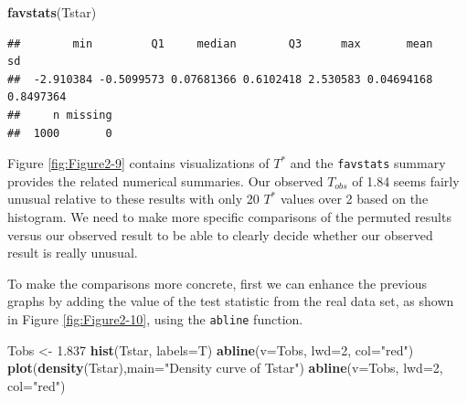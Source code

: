 \documentclass[]{book}
\newenvironment{Shaded}{\begin{snugshade}}{\end{snugshade}}
\newcommand{\KeywordTok}[1]{\textcolor[rgb]{0.13,0.29,0.53}{\textbf{#1}}}
\newcommand{\DataTypeTok}[1]{\textcolor[rgb]{0.13,0.29,0.53}{#1}}
\newcommand{\DecValTok}[1]{\textcolor[rgb]{0.00,0.00,0.81}{#1}}
\newcommand{\FloatTok}[1]{\textcolor[rgb]{0.00,0.00,0.81}{#1}}
\newcommand{\StringTok}[1]{\textcolor[rgb]{0.31,0.60,0.02}{#1}}
\newcommand{\NormalTok}[1]{#1}
\begin{document}
\begin{Shaded}
\begin{Highlighting}[]
\KeywordTok{favstats}\NormalTok{(Tstar)}
\end{Highlighting}
\end{Shaded}

\begin{verbatim}
##        min         Q1     median        Q3      max       mean        sd
##  -2.910384 -0.5099573 0.07681366 0.6102418 2.530583 0.04694168 0.8497364
##     n missing
##  1000       0
\end{verbatim}

Figure \ref{fig:Figure2-9} contains visualizations of \(T^*\) and the
\texttt{favstats} summary provides the related numerical summaries. Our
observed \(T_{obs}\) of 1.84 seems fairly unusual relative to these
results with only 20 \(T^*\) values over 2 based on the histogram. We
need to make more specific comparisons of the permuted results versus
our observed result to be able to clearly decide whether our observed
result is really unusual.

To make the comparisons more concrete, first we can enhance the previous
graphs by adding the value of the test statistic from the real data set,
as shown in Figure \ref{fig:Figure2-10}, using the \texttt{abline}
function.





\begin{Shaded}
\begin{Highlighting}[]
\NormalTok{Tobs <-}\StringTok{ }\FloatTok{1.837}
\KeywordTok{hist}\NormalTok{(Tstar, }\DataTypeTok{labels=}\NormalTok{T)}
\KeywordTok{abline}\NormalTok{(}\DataTypeTok{v=}\NormalTok{Tobs, }\DataTypeTok{lwd=}\DecValTok{2}\NormalTok{, }\DataTypeTok{col=}\StringTok{"red"}\NormalTok{)}
\KeywordTok{plot}\NormalTok{(}\KeywordTok{density}\NormalTok{(Tstar),}\DataTypeTok{main=}\StringTok{"Density curve of Tstar"}\NormalTok{)}
\KeywordTok{abline}\NormalTok{(}\DataTypeTok{v=}\NormalTok{Tobs, }\DataTypeTok{lwd=}\DecValTok{2}\NormalTok{, }\DataTypeTok{col=}\StringTok{"red"}\NormalTok{)}
\end{Highlighting}
\end{Shaded}
\end{document}
